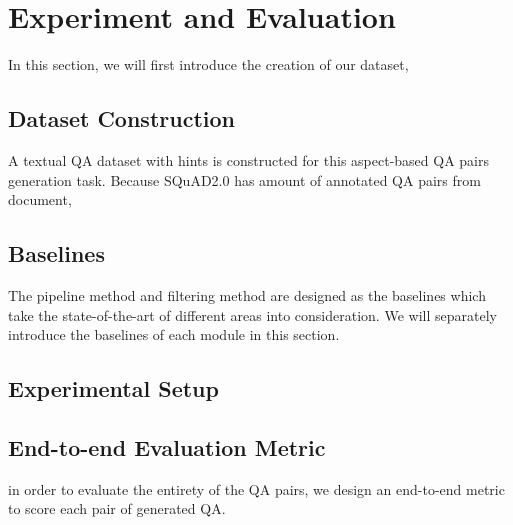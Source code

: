 \section{Experiment and Evaluation}
\label{sec:eval}
In this section, we will first introduce the creation of our dataset,
\subsection{Dataset Construction}
A textual QA dataset with hints is constructed for this aspect-based QA pairs generation task. 
Because SQuAD2.0 has amount of annotated QA pairs from document, 

\subsection{Baselines}
The pipeline method and filtering method are designed as the baselines which take the state-of-the-art of different areas into consideration.
We will separately introduce the baselines of each module in this section.

\subsection{Experimental Setup}

\subsection{End-to-end Evaluation Metric}
in order to evaluate the entirety of the QA pairs, we design an end-to-end metric to score each pair of generated QA.


